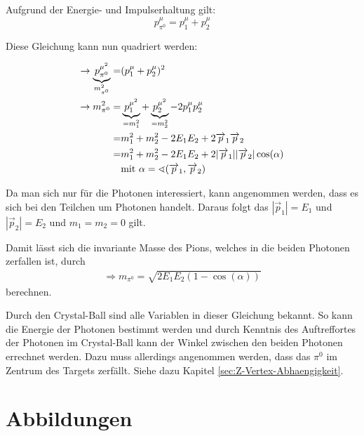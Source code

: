 \documentclass[a4paper,11pt,oneside,final,german,openbib,pdftex]{scrbook}
\begin{document}
{\begin{appendix}
Aufgrund der Energie- und Impulserhaltung gilt:
\begin{equation}
p^{\mu}_{\pi^0} = p^{\mu}_1 + p^{\mu}_2
\end{equation}

Diese Gleichung kann nun quadriert werden:

\begin{equation}
\begin{split}
\rightarrow \underbrace{p^{\mu^2}_{\pi^0}}_{m_{\pi^0}^2}=& (p_{1}^{\mu}+p_{2}^{\mu})^2 \\ 
\rightarrow m_{\pi^0}^2=& \underbrace{p_{1}^{\mu^2}}_{=m_1^2}+\underbrace{p_{2}^{\mu^2}}_{=m_2^2}-2p_{1}^{\mu}p_{2}^{\mu} \\ 
=& m_1^2+m_2^2-2E_1E_2+2\overrightarrow{p}_1\overrightarrow{p}_2 \\ 
=& m_1^2+m_2^2-2E_1E_2+2|\overrightarrow{p}_1| |\overrightarrow{p}_2| \cos(\alpha) \\
&\textnormal{mit } \alpha=\sphericalangle(\overrightarrow{p}_1,\overrightarrow{p}_2)
\end{split}
\end{equation}

Da man sich nur f\"ur die Photonen interessiert, kann angenommen werden, dass es sich bei den Teilchen um Photonen handelt. Daraus folgt das $|\overrightarrow{p}_1|=E_1$ und $|\overrightarrow{p}_2|=E_2$ und $m_1=m_2=0$ gilt.

Damit lässt sich die invariante Masse des Pions, welches in die beiden Photonen zerfallen ist, durch
\begin{equation}
\begin{split}
\Rightarrow{m_{\pi^0}=\sqrt{2E_1E_2(1-\cos(\alpha))}}
\label{eq:Formel-zur-Berechnung-der-Invariante-Masse-Herleitung}
\end{split}
\end{equation}
berechnen.

Durch den Crystal-Ball sind alle Variablen in dieser Gleichung bekannt. So kann die Energie der Photonen bestimmt werden und durch Kenntnis des Auftreffortes der Photonen im Crystal-Ball kann der Winkel zwischen den beiden Photonen errechnet werden. Dazu muss allerdings angenommen werden, dass das $\pi^0$ im Zentrum des Targets zerfällt. Siehe dazu Kapitel \ref{sec:Z-Vertex-Abhaengigkeit}.

\section{Abbildungen}


\end{appendix}}
\end{document}
